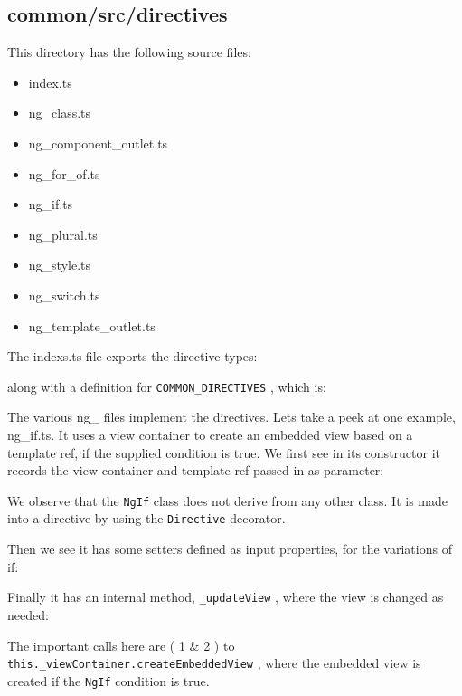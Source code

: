 \subsection{common/src/directives}

This directory has the following source files:

\begin{itemize}
  \item index.ts
  \item ng\_class.ts
  \item ng\_component\_outlet.ts
  \item ng\_for\_of.ts
  \item ng\_if.ts
  \item ng\_plural.ts
  \item ng\_style.ts
  \item ng\_switch.ts
  \item ng\_template\_outlet.ts
\end{itemize}

The indexs.ts file exports the directive types:



along with a definition for
\texttt{COMMON\_DIRECTIVES}
, which is:



The various ng\_ files implement the directives. Lets take a peek at one example,
ng\_if.ts. It uses a view container to create an embedded view based on a template
ref, if the supplied condition is true. We first see in its constructor it records the view
container and template ref passed in as parameter:



We observe that the
\texttt{NgIf}
class does not derive from any other class. It is made into a
directive by using the
\texttt{Directive}
decorator.

Then we see it has some setters defined as input properties, for the variations of if:



Finally it has an internal method,
\texttt{\_updateView}
, where the view is changed as needed:



The important calls here are (
1
\&
2
) to
\texttt{this.\_viewContainer.createEmbeddedView}
,
where the embedded view is created if the
\texttt{NgIf}
condition is true.

